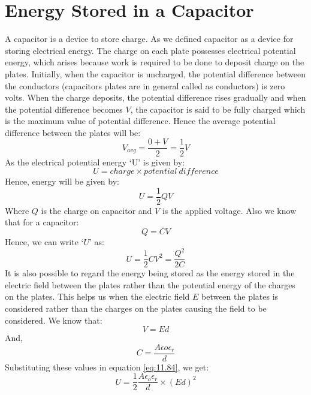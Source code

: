\section{Energy Stored in a Capacitor}
A capacitor is a device to store charge. As we defined capacitor as a
device for storing electrical energy. The charge on each plate possesses
electrical potential energy, which arises because work is required to be
done to deposit charge on the plates. Initially, when the capacitor is
uncharged, the potential difference between the conductors (capacitors
plates are in general called as conductors) is zero volts. When the charge
deposits, the potential difference rises gradually and when the potential
difference becomes $V$, the capacitor is said to be fully charged which is
the maximum value of potential difference.
Hence the average potential difference between the plates will be:
\begin{equation}\nonumber
  V_{avg} = \frac{0+V}{2} = \frac{1}{2} V
\end{equation}
As the electrical potential energy `U’ is given by:
\begin{equation}\nonumber
  U = charge \times potential\:difference
\end{equation}
Hence, energy will be given by:
\begin{equation}\nonumber
  U = \frac{1}{2}QV
\end{equation}
Where $Q$ is the charge on capacitor and $V$ is the applied voltage.
Also we know that for a capacitor:
\begin{equation}\nonumber
  Q = CV
\end{equation}
Hence, we can write `$U$' as:
\begin{equation}\label{eq:11.84}
  U = \frac{1}{2}CV^{2} = \frac{Q^2}{2C}
\end{equation}
It is also possible to regard the energy being stored as the energy
stored in the electric field between the plates rather than the potential
energy of the charges on the plates. This helps us when the electric field
$E$ between the plates is considered rather than the charges
on the plates causing the field to be considered. We know that:
\begin{equation}\nonumber
  V = Ed
\end{equation}
And,
\begin{equation}\nonumber
C = \frac{A\epsilon{o}\epsilon_{r}}{d}
\end{equation}
Substituting these values in equation \ref{eq:11.84}, we get:
\begin{equation}
U = \frac{1}{2}\frac{A\epsilon_{o}\epsilon_{r}}{d}\times (Ed)^{2}\nonumber
\end{equation}
